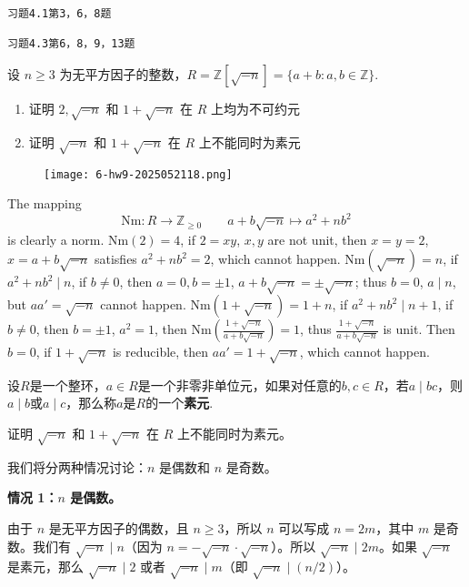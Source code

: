 \begin{lstlisting}
习题4.1第3，6，8题

习题4.3第6，8，9，13题
\end{lstlisting}
\begin{exercise}
设 $n\geq3$ 为无平方因子的整数，$R=\mathbb{Z}[\sqrt{ -n }]=\{ a+b:a,b\in \mathbb{Z} \}$.
	\begin{enumerate}
		\item 证明 $2,\sqrt{ -n }$ 和 $1+\sqrt{ -n }$ 在 $R$ 上均为不可约元
		\item 证明 $\sqrt{ -n }$ 和 $1+\sqrt{ -n }$ 在 $R$ 上不能同时为素元
	\end{enumerate}
\end{exercise}
\begin{example}
\begin{figure}[H]
\centering
\texttt{[image: 6-hw9-2025052118.png]}
\label{}
\end{figure}
\end{example}
The mapping
\[
\mathrm{Nm}: R\to \mathbb{Z}_{\geq 0}\qquad a+b \sqrt{ -n }\mapsto a^2+nb^2
\]
is clearly a norm. $\mathrm{Nm}(2)=4$, if $2=xy$, $x,y$ are not unit, then $x=y=2$, $x=a+b \sqrt{ -n }$ satisfies $a^2+nb^2=2$, which cannot happen. $\mathrm{Nm}(\sqrt{ -n })=n$, if $a^2+nb^2\mid n$, if $b\neq0$, then $a=0,b=\pm1$, $a+b \sqrt{ -n }=\pm\sqrt{ -n }$; thus $b=0$, $a\mid n$, but $aa'=\sqrt{ -n }$ cannot happen. $\mathrm{Nm}(1+\sqrt{ -n })=1+n$, if $a^2+nb^2\mid n+1$, if $b\neq0$, then $b=\pm1$, $a^2=1$, then $\mathrm{Nm}\left( \frac{1+\sqrt{ -n }}{a+b \sqrt{ -n }} \right)=1$, thus $\frac{1+\sqrt{ -n }}{a+b \sqrt{ -n }}$ is unit. Then $b=0$, if $1+\sqrt{ -n }$ is reducible, then $aa'=1+\sqrt{ -n }$, which cannot happen.

\begin{definition}[素元]
设$R$是一个整环，$a \in R$是一个非零非单位元，如果对任意的$b, c \in R$，若$a \mid b c$，则$a \mid b$或$a \mid c$，那么称$a$是$R$的一个\textbf{素元}.
\end{definition}
\begin{example}
证明 $\sqrt{-n}$ 和 $1+\sqrt{-n}$ 在 $R$ 上不能同时为素元。
\end{example}
我们将分两种情况讨论：$n$ 是偶数和 $n$ 是奇数。

\textbf{情况 1：$n$ 是偶数。}

由于 $n$ 是无平方因子的偶数，且 $n \geq 3$，所以 $n$ 可以写成 $n=2m$，其中 $m$ 是奇数。我们有 $\sqrt{-n} \mid n$（因为 $n=-\sqrt{-n} \cdot \sqrt{-n}$）。所以 $\sqrt{-n} \mid 2m$。如果 $\sqrt{-n}$ 是素元，那么 $\sqrt{-n} \mid 2$ 或者 $\sqrt{-n} \mid m$（即 $\sqrt{-n} \mid (n/2)$）。

